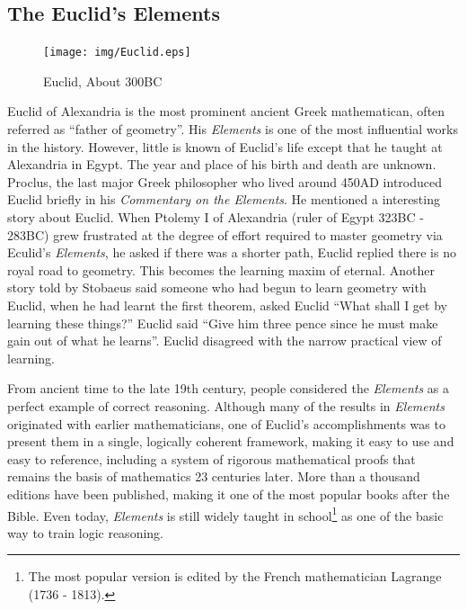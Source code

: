\documentclass{article}
\begin{document}
\subsection{The Euclid's Elements}

\begin{figure}
 \centering
 \texttt{[image: img/Euclid.eps]}
 \captionsetup{labelformat=empty}
 \caption{Euclid, About 300BC}
 \label{fig:Euclid}
\end{figure}

Euclid of Alexandria is the most prominent ancient Greek mathematican, often referred as ``father of geometry''. His {\em Elements} is one of the most influential works in the history. However, little is known of Euclid's life except that he taught at Alexandria in Egypt. The year and place of his birth and death are unknown. Proclus, the last major Greek philosopher who lived around 450AD introduced Euclid briefly in his {\em Commentary on the Elements}. He mentioned a interesting story about Euclid. When Ptolemy I of Alexandria (ruler of Egypt 323BC - 283BC) grew frustrated at the degree of effort required to master geometry via Eculid's {\em Elements}, he asked if there was a shorter path, Euclid replied there is no royal road to geometry. This becomes the learning maxim of eternal. Another story told by Stobaeus said someone who had begun to learn geometry with Euclid, when he had learnt the first theorem, asked Euclid ``What shall I get by learning these things?'' Euclid said ``Give him three pence since he must make gain out of what he learns''. Euclid disagreed with the narrow practical view of learning\cite{Elements}.

From ancient time to the late 19th century, people considered the {\em Elements} as a perfect example of correct reasoning. Although many of the results in {\em Elements} originated with earlier mathematicians, one of Euclid's accomplishments was to present them in a single, logically coherent framework, making it easy to use and easy to reference, including a system of rigorous mathematical proofs that remains the basis of mathematics 23 centuries later. More than a thousand editions have been published, making it one of the most popular books after the Bible. Even today, {\em Elements} is still widely taught in school\footnote{The most popular version is edited by the French mathematician Lagrange (1736 - 1813).} as one of the basic way to train logic reasoning\cite{HanXueTao16}.
\end{document}
